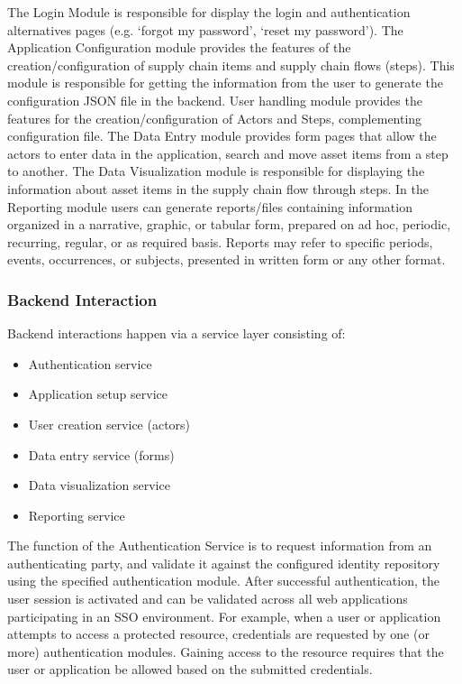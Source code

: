 The Login Module is responsible for display the login and authentication alternatives pages (e.g. ‘forgot my password’, ‘reset my password’). The Application Configuration module provides the features of the creation/configuration of supply chain items and supply chain flows (steps). This module is responsible for getting the information from the user to generate the configuration JSON file in the backend. User handling module provides the features for the creation/configuration of Actors and Steps, complementing configuration file. The Data Entry module provides form pages that allow the actors to enter data in the application, search and move asset items from a step to another. The Data Visualization module is responsible for displaying the information about asset items in the supply chain flow through steps. In the Reporting module users can generate reports/files containing information organized in a narrative, graphic, or tabular form, prepared on ad hoc, periodic, recurring, regular, or as required basis. Reports may refer to specific periods, events, occurrences, or subjects, presented in written form or any other format.


\subsubsection{Backend Interaction}\label{sec:BackendInteraction}
Backend interactions happen via a service layer consisting of:

\begin{itemize}
\item Authentication service
\item Application setup service
\item User creation service (actors)
\item Data entry service (forms)
\item Data visualization service
\item Reporting service
\end{itemize}

The function of the Authentication Service is to request information from an authenticating party, and validate it against the configured identity repository using the specified authentication module. After successful authentication, the user session is activated and can be validated across all web applications participating in an SSO environment. For example, when a user or application attempts to access a protected resource, credentials are requested by one (or more) authentication modules. Gaining access to the resource requires that the user or application be allowed based on the submitted credentials.

